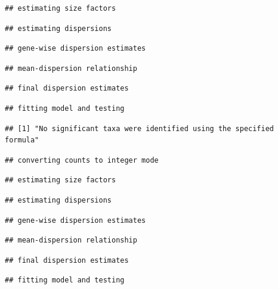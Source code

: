 \documentclass[]{article}
\begin{document}
\begin{verbatim}
## estimating size factors
\end{verbatim}

\begin{verbatim}
## estimating dispersions
\end{verbatim}

\begin{verbatim}
## gene-wise dispersion estimates
\end{verbatim}

\begin{verbatim}
## mean-dispersion relationship
\end{verbatim}

\begin{verbatim}
## final dispersion estimates
\end{verbatim}

\begin{verbatim}
## fitting model and testing
\end{verbatim}

\begin{verbatim}
## [1] "No significant taxa were identified using the specified formula"
\end{verbatim}

\begin{verbatim}
## converting counts to integer mode
\end{verbatim}

\begin{verbatim}
## estimating size factors
\end{verbatim}

\begin{verbatim}
## estimating dispersions
\end{verbatim}

\begin{verbatim}
## gene-wise dispersion estimates
\end{verbatim}

\begin{verbatim}
## mean-dispersion relationship
\end{verbatim}

\begin{verbatim}
## final dispersion estimates
\end{verbatim}

\begin{verbatim}
## fitting model and testing
\end{verbatim}
\end{document}
